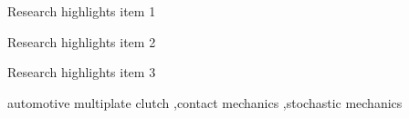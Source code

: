 \documentclass[a4paper,fleqn]{cas-dc}
\begin{document}

\begin{abstract}
judder in plate clutch in MBS simulation. characteristic of plate clutch and relevant dynamic phenomenon: many contacts, surface deviations after production. 

\noindent\texttt{\textbackslash begin{abstract}} \dots 
\texttt{\textbackslash end{abstract}} and
\verb+\begin{keyword}+ \verb+...+ \verb+\end{keyword}+ 
which
contain the abstract and keywords respectively. 

\noindent Each keyword shall be separated by a \verb+\sep+ command.
\end{abstract}


\begin{highlights}
\item Research highlights item 1
\item Research highlights item 2
\item Research highlights item 3
\end{highlights}

\begin{keywords}
automotive multiplate clutch \sep contact mechanics \sep stochastic mechanics
\end{keywords}


\maketitle
\end{document}
